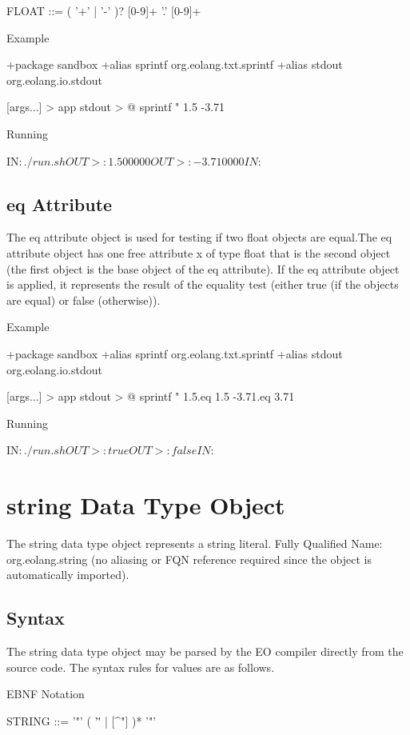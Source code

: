 \documentclass[12pt]{book}
\begin{document}
\begin{ffcode}
FLOAT    ::= ( '+' | '-' )? [0-9]+ '.' [0-9]+
\end{ffcode}

Example
\begin{ffcode}
+package sandbox
+alias sprintf org.eolang.txt.sprintf
+alias stdout org.eolang.io.stdout

[args...] > app
  stdout > @
    sprintf
      "%
      1.5
      -3.71

Running

IN$: ./run.sh
OUT>: 1.500000
OUT>: -3.710000
IN$: 
\end{ffcode}

\subsection{eq Attribute}
The eq attribute object is used for testing if two float objects are equal.The eq attribute object has one free attribute x of type float that is the second object (the first object is the base object of the eq attribute).
If the eq attribute object is applied, it represents the result of the equality test (either true (if the objects are equal) or false (otherwise)).

Example
\begin{ffcode}
+package sandbox
+alias sprintf org.eolang.txt.sprintf
+alias stdout org.eolang.io.stdout

[args...] > app
  stdout > @
    sprintf
      "%
      1.5.eq 1.5
      -3.71.eq 3.71

Running

IN$: ./run.sh
OUT>: true
OUT>: false
IN$: 
\end{ffcode}

\section{string Data Type Object}
The string data type object represents a string literal.
Fully Qualified Name: org.eolang.string (no aliasing or FQN reference required since the object is automatically imported).

\subsection{Syntax}
The string data type object may be parsed by the EO compiler directly from the source code. The syntax rules for values are as follows.

EBNF Notation
\begin{ffcode}

STRING   ::= '"' ( '\"' | [^"] )* '"'
\end{ffcode}
\end{document}
